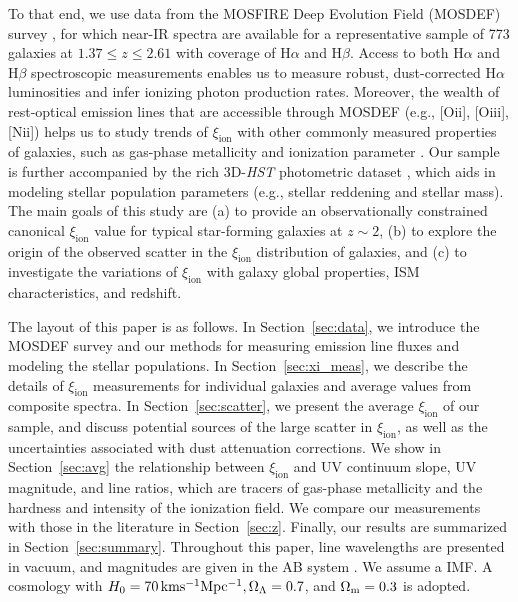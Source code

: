 \documentclass[iop]{emulateapj}
\newcommand{\xiion}{\ensuremath{\xi_{\mathrm{ion}}}}
\newcommand{\halpha}{H\ensuremath{\alpha}}
\newcommand{\hbeta}{H\ensuremath{\beta}}
\begin{document}
To that end, we use data from the MOSFIRE Deep Evolution Field (MOSDEF) survey \citep{kriek15}, for which near-IR spectra are available for a representative sample of 773 galaxies at $1.37\leq z\leq 2.61$ with coverage of {\halpha} and {\hbeta}. 
Access to both {\halpha} and {\hbeta} spectroscopic measurements enables us to measure robust, dust-corrected {\halpha} luminosities \citep{kennicutt09,hao11,reddy15,shivaei15b,shivaei16} and infer ionizing photon production rates.
Moreover, the wealth of rest-optical emission lines that are accessible through MOSDEF (e.g., [O{\sc ii}], [O{\sc iii}], [N{\sc ii}]) helps us to study trends of {\xiion} with other commonly measured properties of galaxies, such as gas-phase metallicity and ionization parameter \citep{sanders15,sanders16a,shapley15}.
Our sample is further accompanied by the rich 3D-{\em HST} photometric dataset \citep{skelton14}, which aids in modeling stellar population parameters (e.g., stellar reddening and stellar mass).
The main goals of this study are (a) to provide an observationally constrained canonical {\xiion} value for typical star-forming galaxies at $z\sim 2$, (b) to explore the origin of the observed scatter in the {\xiion} distribution of galaxies, and (c) to investigate the variations of {\xiion} with galaxy global properties, ISM characteristics, and redshift.

The layout of this paper is as follows. In Section~\ref{sec:data}, we introduce the MOSDEF survey and our methods for measuring emission line fluxes and modeling the stellar populations. In Section~\ref{sec:xi_meas}, we describe the details of {\xiion} measurements for individual galaxies and average values from composite spectra. 
In Section~\ref{sec:scatter}, we present the average {\xiion} of our sample, and discuss potential sources of the large scatter in {\xiion}, as well as the uncertainties associated with dust attenuation corrections.
We show in Section~\ref{sec:avg} the relationship between {\xiion} and UV continuum slope, UV magnitude, and line ratios, which are tracers of gas-phase metallicity and the hardness and intensity of the ionization field. We compare our measurements with those in the literature in Section~\ref{sec:z}. Finally, our results are summarized in Section~\ref{sec:summary}.
Throughout this paper, line wavelengths are presented in vacuum, and magnitudes are given in the AB system \citep{oke83}. We assume a \citet{chabrier03} IMF. A cosmology with $H_0 = 70\,{\rm km s^{-1} Mpc^{-1}, \Omega_{\Lambda} = 0.7}$, and ${\rm \Omega_m = 0.3}$ is adopted.
\end{document}
